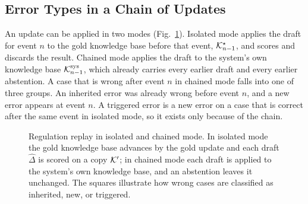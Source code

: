 \subsection{Error Types in a Chain of Updates}
\label{sec:errortypes}
An update can be applied in two modes (Fig.~\ref{fig:protocol}). Isolated mode applies the draft for event $n$ to the gold knowledge base before that event, $\mathcal{K}^\star_{n-1}$, and scores and discards the result. Chained mode applies the draft to the system's own knowledge base $\mathcal{K}^{\mathrm{sys}}_{n-1}$, which already carries every earlier draft and every earlier abstention. A case that is wrong after event $n$ in chained mode falls into one of three groups. An inherited error was already wrong before event $n$, and a new error appears at event $n$. A triggered error is a new error on a case that is correct after the same event in isolated mode, so it exists only because of the chain.

\begin{figure}[!t]
\centering
\figReplayProtocol
\caption{Regulation replay in isolated and chained mode. In isolated mode the gold knowledge base advances by the gold update and each draft $\hat{\Delta}$ is scored on a copy $\mathcal{K}'$; in chained mode each draft is applied to the system's own knowledge base, and an abstention leaves it unchanged. The squares illustrate how wrong cases are classified as inherited, new, or triggered.}
\label{fig:protocol}
\end{figure}
